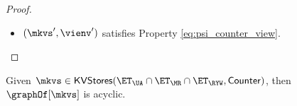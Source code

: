 \begin{proof}
\begin{itemize}
\begin{itemize}
\begin{itemize}
\item $\txid' \in \txidset'_{i}$. We need to distinguish the cases $i \neq m$, leading to $\txidset'_{i} = \txidset_{i}$, 
or $i = m$, in which case $\txidset'_{i} = \txidset'_{m} = \txidset_{m} \cup \Set{\txid}$. If either $i \neq m$, or $i = m$ and $\txid \in 
\txidset_{m}$, then we can proceed as in the case $\txid' = \txid_{i}$. Otherwise, suppose that $i = m$ and 
$\txid' = \txid$. Then, because $\txid' \toEDGE{\SO} \txid''$, and $\txid \in \nextTxid(\mkvs,\cl)$, 
it must be the case that $\txid = \txid_{\cl}^{p}$ for some $p \geq 0$, and whenever 
$\txid_{\cl}^{\cdot} \in \key$, then $\txid_{\cl}^{\cdot} \toEDGE{\SO} \txid$. In particular 
we cannot have that $\txid'' \in \key$, because $\txid \toEDGE{\SO} \txid''$, which 
concludes the proof.
\end{itemize}

\item $(\mkvs', \vienv')$ satisfies Property \eqref{eq:psi_counter_view}.

\end{itemize}

\end{itemize}

\end{proof}

\begin{corollary}
\label{cor:psi_counter_acyclic}
Given $\mkvs \in \mathsf{KVStores}(\ET_{\UA} \cap \ET_{\MR} \cap \ET_{\RYW}, \mathsf{Counter})$, 
then $\graphOf[\mkvs]$ is acyclic.
\end{corollary}

